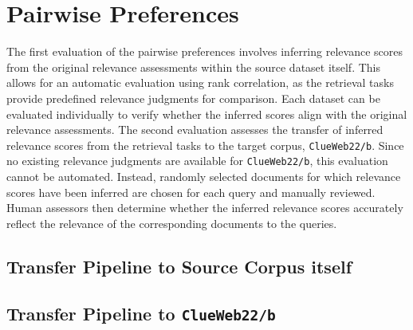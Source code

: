 \section{Pairwise Preferences}\label{eval-pairwise-preferences}

The first evaluation of the pairwise preferences involves inferring relevance scores from the original relevance assessments within the source dataset itself. This allows for an automatic evaluation using rank correlation, as the retrieval tasks provide predefined relevance judgments for comparison. Each dataset can be evaluated individually to verify whether the inferred scores align with the original relevance assessments. The second evaluation assesses the transfer of inferred relevance scores from the retrieval tasks to the target corpus, \texttt{ClueWeb22/b}. Since no existing relevance judgments are available for \texttt{ClueWeb22/b}, this evaluation cannot be automated. Instead, randomly selected documents for which relevance scores have been inferred are chosen for each query and manually reviewed. Human assessors then determine whether the inferred relevance scores accurately reflect the relevance of the corresponding documents to the queries.

\subsection{Transfer Pipeline to Source Corpus itself}\label{eval-pairwise-preferences-source}

\subsection{Transfer Pipeline to \texttt{ClueWeb22/b}}\label{eval-pairwise-preferences-target}